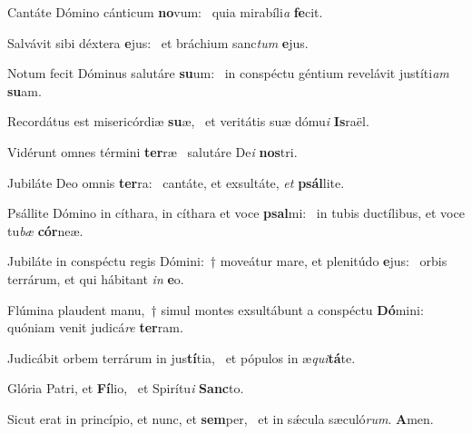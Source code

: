 \item Cantáte Dómino cánticum \textbf{no}vum:~\psstar{} quia mirabíli\textit{a} \textbf{fe}cit.
\item Salvávit sibi déxtera \textbf{e}jus:~\psstar{} et bráchium sanc\textit{tum} \textbf{e}jus.
\item Notum fecit Dóminus salutáre \textbf{su}um:~\psstar{} in conspéctu géntium revelávit justíti\textit{am} \textbf{su}am.
\item Recordátus est misericórdiæ \textbf{su}æ,~\psstar{} et veritátis suæ dómu\textit{i} \textbf{Is}raël.
\item Vidérunt omnes términi \textbf{ter}ræ~\psstar{} salutáre De\textit{i} \textbf{nos}tri.
\item Jubiláte Deo omnis \textbf{ter}ra:~\psstar{} cantáte, et exsultáte, \textit{et} \textbf{psál}lite.
\item Psállite Dómino in cíthara, in cíthara et voce \textbf{psal}mi:~\psstar{} in tubis ductílibus, et voce tu\textit{bæ} \textbf{cór}neæ.
\item Jubiláte in conspéctu regis Dómini:~† moveátur mare, et plenitúdo \textbf{e}jus:~\psstar{} orbis terrárum, et qui hábitant \textit{in} \textbf{e}o.
\item Flúmina plaudent manu,~† simul montes exsultábunt a conspéctu \textbf{Dó}mini:~\psstar{} quóniam venit judicá\textit{re} \textbf{ter}ram.
\item Judicábit orbem terrárum in jus\textbf{tí}tia,~\psstar{} et pópulos in æ\textit{qui}\textbf{tá}te.
\item Glória Patri, et \textbf{Fí}lio,~\psstar{} et Spirítu\textit{i} \textbf{Sanc}to.
\item Sicut erat in princípio, et nunc, et \textbf{sem}per,~\psstar{} et in sǽcula sæculó\textit{rum}. \textbf{A}men.